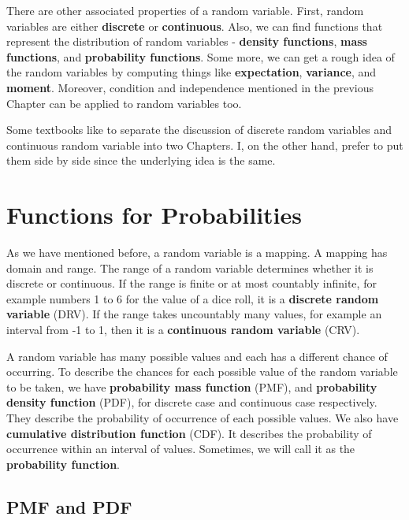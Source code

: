 \documentclass[11pt, a4paper, oneside]{book}
\theoremstyle{definition}
\begin{document}
\noindent There are other associated properties of a random variable. First, random variables are either \textbf{discrete} or \textbf{continuous}. Also, we can find functions that represent the distribution of random variables - \textbf{density functions}, \textbf{mass functions}, and \textbf{probability functions}. Some more, we can get a rough idea of the random variables by computing things like \textbf{expectation}, \textbf{variance}, and \textbf{moment}. Moreover, condition and independence mentioned in the previous Chapter can be applied to random variables too. 

\noindent Some textbooks like to separate the discussion of discrete random variables and continuous random variable into two Chapters. I, on the other hand, prefer to put them side by side since the underlying idea is the same.

\section{Functions for Probabilities}

\noindent As we have mentioned before, a random variable is a mapping. A mapping has domain and range. The range of a random variable determines whether it is discrete or continuous. If the range is finite or at most countably infinite, for example numbers 1 to 6 for the value of a dice roll, it is a \textbf{discrete random variable} (DRV). If the range takes uncountably many values, for example an interval from -1 to 1, then it is a \textbf{continuous random variable} (CRV). 

\noindent A random variable has many possible values and each has a different chance of occurring. To describe the chances for each possible value of the random variable to be taken, we have \textbf{probability mass function} (PMF), and \textbf{probability density function} (PDF), for discrete case and continuous case respectively. They describe the probability of occurrence of each possible values. We also have \textbf{cumulative distribution function} (CDF). It describes the probability of occurrence within an interval of values. Sometimes, we will call it as the \textbf{probability function}. 

\subsection{PMF and PDF} 
\end{document}
